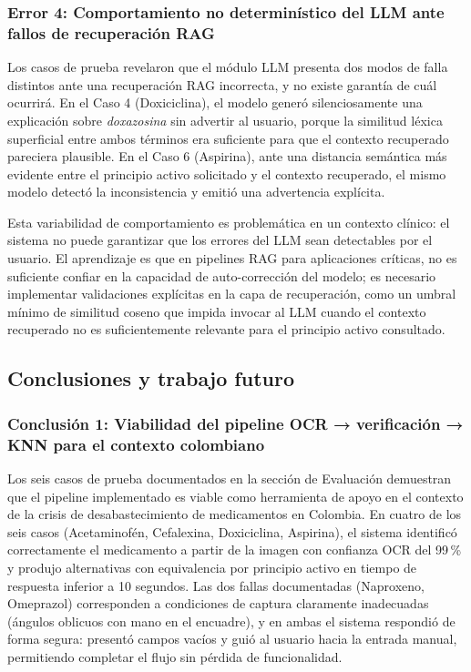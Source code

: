 \subsubsection*{Error 4: Comportamiento no determinístico del LLM ante fallos de recuperación RAG}

Los casos de prueba revelaron que el módulo LLM presenta dos modos de falla distintos ante una recuperación RAG incorrecta, y no existe garantía de cuál ocurrirá. En el Caso 4 (Doxiciclina), el modelo generó silenciosamente una explicación sobre \textit{doxazosina} sin advertir al usuario, porque la similitud léxica superficial entre ambos términos era suficiente para que el contexto recuperado pareciera plausible. En el Caso 6 (Aspirina), ante una distancia semántica más evidente entre el principio activo solicitado y el contexto recuperado, el mismo modelo detectó la inconsistencia y emitió una advertencia explícita.

Esta variabilidad de comportamiento es problemática en un contexto clínico: el sistema no puede garantizar que los errores del LLM sean detectables por el usuario. El aprendizaje es que en pipelines RAG para aplicaciones críticas, no es suficiente confiar en la capacidad de auto-corrección del modelo; es necesario implementar validaciones explícitas en la capa de recuperación, como un umbral mínimo de similitud coseno que impida invocar al LLM cuando el contexto recuperado no es suficientemente relevante para el principio activo consultado.


\subsection{Conclusiones y trabajo futuro}

\subsubsection*{Conclusión 1: Viabilidad del pipeline OCR → verificación → KNN para el contexto colombiano}

Los seis casos de prueba documentados en la sección de Evaluación demuestran que el pipeline implementado es viable como herramienta de apoyo en el contexto de la crisis de desabastecimiento de medicamentos en Colombia. En cuatro de los seis casos (Acetaminofén, Cefalexina, Doxiciclina, Aspirina), el sistema identificó correctamente el medicamento a partir de la imagen con confianza OCR del 99\,\% y produjo alternativas con equivalencia por principio activo en tiempo de respuesta inferior a 10 segundos. Las dos fallas documentadas (Naproxeno, Omeprazol) corresponden a condiciones de captura claramente inadecuadas (ángulos oblicuos con mano en el encuadre), y en ambas el sistema respondió de forma segura: presentó campos vacíos y guió al usuario hacia la entrada manual, permitiendo completar el flujo sin pérdida de funcionalidad.

